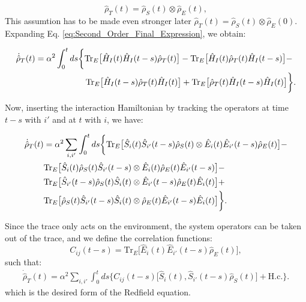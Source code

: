 \begin{equation}
	\hat{\rho}_T(t) = \hat{\rho}_S(t) \otimes \hat{\rho}_E(t),
	\label{eq:Reduced_Density_Matrix_Assumption}
\end{equation}
This assumtion has to be made even stronger later $\hat{\rho}_T(t) = \hat{\rho}_S(t) \otimes \hat{\rho}_E(0)$.
Expanding Eq. \eqref{eq:Second_Order_Final_Expression}, we obtain:

\begin{align}
	\dot{\hat{\rho}}_T(t) & =  \alpha^2 \int_0^t ds
	\bigg\{
	\mathrm{Tr}_E \big[ \hat{H}_I(t) \hat{H}_I(t-s) \hat{\rho}_T(t) \big] -
	\mathrm{Tr}_E \big[ \hat{H}_I(t) \hat{\rho}_T(t) \hat{H}_I(t-s) \big] - \notag \\
	                      & \qquad \qquad \qquad
	\mathrm{Tr}_E \big[ \hat{H}_I(t-s) \hat{\rho}_T(t) \hat{H}_I(t) \big] +
	\mathrm{Tr}_E \big[ \hat{\rho}_T(t) \hat{H}_I(t-s) \hat{H}_I(t) \big]
	\bigg\}.
	\label{eq:Expanded_Second_Order_Expression}
\end{align}

Now, inserting the interaction Hamiltonian by tracking the operators at time $t - s$ with $i'$ and at $t$ with $i$, we have:

\begin{align}
	\dot{\hat{\rho}}_T(t) & = \alpha^2  \sum_{i, i'} \int_0^t ds
	\bigg\{
	\mathrm{Tr}_E \big[ \hat{S}_i(t) \hat{S}_{i'}(t-s) \hat{\rho}_S(t)      \otimes   \hat{E}_{i}(t) \hat{E}_{i'}(t-s) \hat{\rho}_E(t)  \big] -  \notag                         \\
	                      & \mathrm{Tr}_E \big[ \hat{S}_i(t) \hat{\rho}_S(t) \hat{S}_{i'}(t-s)      \otimes   \hat{E}_{i}(t) \hat{\rho}_E(t) \hat{E}_{i'}(t-s)  \big] - \notag  \\
	                      & \mathrm{Tr}_E \big[ \hat{S}_{i'}(t-s) \hat{\rho}_S(t) \hat{S}_i(t)      \otimes   \hat{E}_{i'}(t-s) \hat{\rho}_E(t) \hat{E}_{i}(t)  \big] +  \notag \\
	                      & \mathrm{Tr}_E \big[ \hat{\rho}_S(t) \hat{S}_{i'}(t-s) \hat{S}_i(t)      \otimes   \hat{\rho}_E(t) \hat{E}_{i'}(t-s) \hat{E}_{i}(t)  \big]
	\bigg\}.
	\label{eq:Interaction_Hamiltonian_Expansion}
\end{align}

Since the trace only acts on the environment, the system operators can be taken out of the trace, and we define the correlation functions:
\begin{equation}
	C_{ij}(t - s) = \mathrm{Tr}_E \big[\hat{E}_{i}(t) \hat{E}_{i'}(t-s) \hat{\rho}_E(t)\big],
	\label{eq:Environment_Correlation_Function}
\end{equation}
such that:
\begin{align}
	\dot{\hat{\rho}}_T(t) = \alpha^2  \sum_{i, i'} \int_0^t ds
	\bigg\{
	C_{ij}(t - s) \big[ \hat{S}_i(t),  \hat{S}_{i'}(t-s) \hat{\rho}_S(t) \big] + \text{H.c.}
	\bigg\}.
	\label{eq:Redfield_Equation_Final}
\end{align}
which is the desired form of the Redfield equation.


